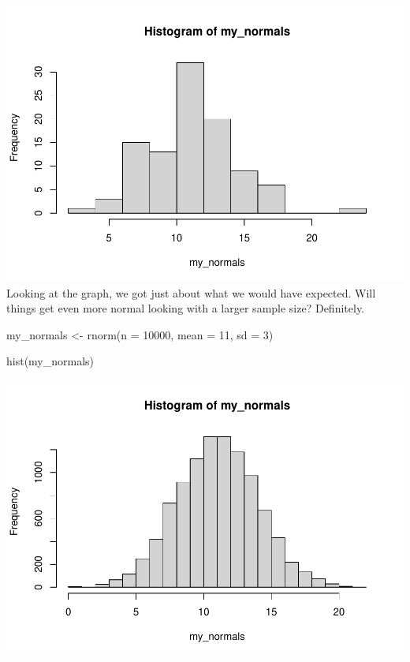 \documentclass[
]{book}
\newenvironment{Shaded}{\begin{snugshade}}{\end{snugshade}}
\newcommand{\AttributeTok}[1]{\textcolor[rgb]{0.77,0.63,0.00}{#1}}
\newcommand{\DecValTok}[1]{\textcolor[rgb]{0.00,0.00,0.81}{#1}}
\newcommand{\FunctionTok}[1]{\textcolor[rgb]{0.00,0.00,0.00}{#1}}
\newcommand{\NormalTok}[1]{#1}
\newcommand{\OtherTok}[1]{\textcolor[rgb]{0.56,0.35,0.01}{#1}}
\begin{document}
\includegraphics{_main_files/figure-latex/unnamed-chunk-165-1.pdf}
Looking at the graph, we got just about what we would have expected. Will things get even more normal looking with a larger sample size? Definitely.

\begin{Shaded}
\begin{Highlighting}[]
\NormalTok{my\_normals }\OtherTok{\textless{}{-}} \FunctionTok{rnorm}\NormalTok{(}\AttributeTok{n =} \DecValTok{10000}\NormalTok{, }\AttributeTok{mean =} \DecValTok{11}\NormalTok{, }\AttributeTok{sd =} \DecValTok{3}\NormalTok{)}

\FunctionTok{hist}\NormalTok{(my\_normals)}
\end{Highlighting}
\end{Shaded}

\includegraphics{_main_files/figure-latex/unnamed-chunk-166-1.pdf}
\end{document}
